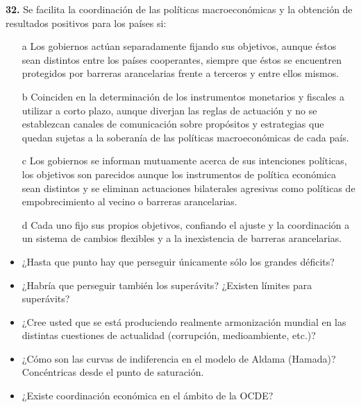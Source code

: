 \documentclass{nuevotema}
\begin{document}
\textbf{32.} Se facilita la coordinación de las políticas macroeconómicas y la obtención de resultados positivos para los países si:
\begin{itemize}
	\item[a] Los gobiernos actúan separadamente fijando sus objetivos, aunque éstos sean distintos entre los países cooperantes, siempre que éstos se encuentren protegidos por barreras arancelarias frente a terceros y entre ellos mismos.
	\item[b] Coinciden en la determinación de los instrumentos monetarios y fiscales a utilizar a corto plazo, aunque diverjan las reglas de actuación y no se establezcan canales de comunicación sobre propósitos y estrategias que quedan sujetas a la soberanía de las políticas macroeconómicas de cada país.
	\item[c] Los gobiernos se informan mutuamente acerca de sus intenciones políticas, los objetivos son parecidos aunque los instrumentos de política económica sean distintos y se eliminan actuaciones bilaterales agresivas como políticas de empobrecimiento al vecino o barreras arancelarias.
	\item[d] Cada uno fijo sus propios objetivos, confiando el ajuste y la coordinación a un sistema de cambios flexibles y a la inexistencia de barreras arancelarias. 
\end{itemize}

\begin{itemize}
	\item ¿Hasta que punto hay que perseguir únicamente sólo los grandes déficits?
	\item ¿Habría que perseguir también los superávits? ¿Existen límites para superávits?
	\item ¿Cree usted que se está produciendo realmente armonización mundial en las distintas cuestiones de actualidad (corrupción, medioambiente, etc.)?
	\item ¿Cómo son las curvas de indiferencia en el modelo de Aldama (Hamada)? Concéntricas desde el punto de saturación.
	\item ¿Existe coordinación económica en el ámbito de la OCDE?
\end{itemize}
\end{document}
